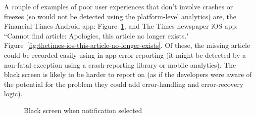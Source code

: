 A couple of examples of poor user experiences that don't involve crashes or freezes (so would not be detected using the platform-level analytics) are, the Financial Times Android app: Figure~\ref{fig:ft_android_app_bsod}, and The Times newspaper iOS app: ``Cannot find article: Apologies, this article no longer exists." Figure~\ref{fig:thetimes-ios-this-article-no-longer-exists}. Of these, the missing article could be recorded easily using in-app error reporting (it might be detected by a non-fatal exception using a crash-reporting library or mobile analytics). The black screen is likely to be harder to report on (as if the developers were aware of the potential for the problem they could add error-handling and error-recovery logic).

\begin{figure}[!htbp]
    \centering
    \hfill
      \caption{Black screen when notification selected}
    \label{fig:ft_android_app_bsod}
\end{figure}

